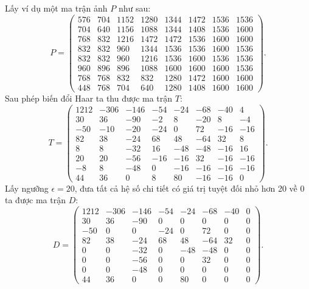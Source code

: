 Lấy ví dụ một ma trận ảnh $P$ như sau:
$$P = \begin{pmatrix}
    576 & 704 & 1152 & 1280 & 1344 & 1472 & 1536 & 1536 \\
    704 & 640 & 1156 & 1088 & 1344 & 1408 & 1536 & 1600 \\
    768 & 832 & 1216 & 1472 & 1472 & 1536 & 1600 & 1600 \\
    832 & 832 &  960 & 1344 & 1536 & 1536 & 1600 & 1536 \\
    832 & 832 &  960 & 1216 & 1536 & 1600 & 1536 & 1536 \\
    960 & 896 &  896 & 1088 & 1600 & 1600 & 1600 & 1536 \\
    768 & 768 &  832 &  832 & 1280 & 1472 & 1600 & 1600 \\
    448 & 768 &  704 &  640 & 1280 & 1408 & 1600 & 1600
\end{pmatrix}.$$
Sau phép biến đổi Haar ta thu được ma trận $T$:
$$T = \begin{pmatrix}
    1212 & -306 & -146 &  -54 &  -24 &  -68 &  -40 &   4 \\
      30 &   36 &  -90 &   -2 &    8 &  -20 &    8 &  -4 \\
     -50 &  -10 &  -20 &  -24 &    0 &   72 &  -16 & -16 \\
      82 &   38 &  -24 &   68 &   48 &  -64 &   32 &   8 \\
       8 &    8 &  -32 &   16 &  -48 &  -48 &  -16 &  16 \\
      20 &   20 &  -56 &  -16 &  -16 &   32 &  -16 & -16 \\
      -8 &    8 &  -48 &    0 &  -16 &  -16 &  -16 & -16 \\
      44 &   36 &    0 &    8 &   80 &  -16 &  -16 &   0
\end{pmatrix}.$$
Lấy ngưỡng $\epsilon = 20$, đưa tất cả hệ số chi tiết có giá trị tuyệt đối nhỏ hơn 20 về 0 ta được ma trận $D$:
$$D = \begin{pmatrix}
    1212 & -306 & -146 &  -54 &  -24 &  -68 &  -40 &   0 \\
      30 &   36 &  -90 &    0 &    0 &    0 &    0 &   0 \\
     -50 &    0 &    0 &  -24 &    0 &   72 &    0 &   0 \\
      82 &   38 &  -24 &   68 &   48 &  -64 &   32 &   0 \\
       0 &    0 &  -32 &    0 &  -48 &  -48 &    0 &   0 \\
       0 &    0 &  -56 &    0 &    0 &   32 &    0 &   0 \\
       0 &    0 &  -48 &    0 &    0 &    0 &    0 &   0 \\
      44 &   36 &    0 &    0 &   80 &    0 &    0 &   0
\end{pmatrix}.$$
